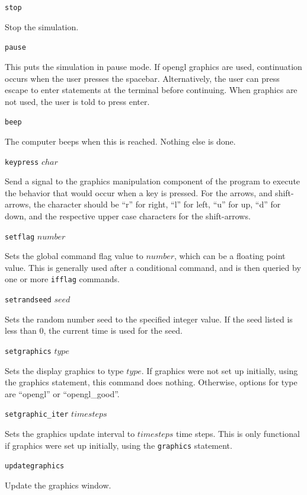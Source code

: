 \documentclass {scrbook}
\newcommand {\ttt} {\texttt}
\begin{document}
\begin{description}

\item{\ttt{stop}}

Stop the simulation.

\item{\ttt{pause}}

This puts the simulation in pause mode. If opengl graphics are used, continuation occurs when the user presses the spacebar. Alternatively, the user can press escape to enter statements at the terminal before continuing. When graphics are not used, the user is told to press enter.

\item{\ttt{beep}}

The computer beeps when this is reached. Nothing else is done.

\item{\ttt{keypress} $char$}

Send a signal to the graphics manipulation component of the program to execute the behavior that would occur when a key is pressed. For the arrows, and shift-arrows, the character should be ``r'' for right, ``l'' for left, ``u'' for up, ``d'' for down, and the respective upper case characters for the shift-arrows.

\item{\ttt{setflag} $number$}

Sets the global command flag value to $number$, which can be a floating point value. This is generally used after a conditional command, and is then queried by one or more \ttt{ifflag} commands.

\item{\ttt{setrandseed} $seed$}

Sets the random number seed to the specified integer value. If the seed listed is less than 0, the current time is used for the seed.

\item{\ttt{setgraphics} $type$}

Sets the display graphics to type $type$. If graphics were not set up initially, using the graphics statement, this command does nothing. Otherwise, options for type are ``opengl'' or ``opengl\_good''.

\item{\ttt{setgraphic\_iter} $timesteps$}

Sets the graphics update interval to $timesteps$ time steps. This is only functional if graphics were set up initially, using the \ttt{graphics} statement.

\item{\ttt{updategraphics}}

Update the graphics window.

\end{description}
\end{document}
